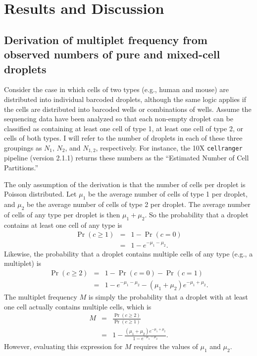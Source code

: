 \documentclass[fleqn,10pt]{wlpeerj} %
\begin{document}
\section*{Results and Discussion}
\label{sec:results}

\subsection*{Derivation of multiplet frequency from observed numbers of pure and mixed-cell droplets}
Consider the case in which cells of two types (e.g., human and mouse) are distributed into individual barcoded droplets, although the same logic applies if the cells are distributed into barcoded wells or combinations of wells.
Assume the sequencing data have been analyzed so that each non-empty droplet can be classified as containing at least one cell of type 1, at least one cell of type 2, or cells of both types.
I will refer to the number of droplets in each of these three groupings as $N_1$, $N_2$, and $N_{1,2}$, respectively.
For instance, the 10X \texttt{cellranger} pipeline (version 2.1.1) returns these numbers as the ``Estimated Number of Cell Partitions.''

The only assumption of the derivation is that the number of cells per droplet is Poisson distributed.
Let $\mu_1$ be the average number of cells of type 1 per droplet, and $\mu_2$ be the average number of cells of type 2 per droplet.
The average number of cells of any type per droplet is then $\mu_1 + \mu_2$.
So the probability that a droplet contains at least one cell of any type is
\begin{eqnarray}
\label{eq:Pr1}
\Pr\left(c \ge 1\right) &=& 1 - \Pr\left(c = 0 \right) \nonumber \\
&=& 1 - e^{-\mu_1 - \mu_2}.
\end{eqnarray}
Likewise, the probability that a droplet contains multiple cells of any type (e.g., a multiplet) is
\begin{eqnarray}
\label{eq:Pr2}
\Pr\left(c \ge 2\right) &=& 1 - \Pr\left(c = 0\right) - \Pr\left(c = 1\right) \nonumber \\
&=& 1 - e^{-\mu_1 - \mu_2} - \left(\mu_1 + \mu_2\right) e^{-\mu_1 + \mu_2}.
\end{eqnarray}
The multiplet frequency $M$ is simply the probability that a droplet with at least one cell actually contains multiple cells, which is
\begin{eqnarray}
\label{eq:M}
M &=& \frac{\Pr\left(c \ge 2\right)}{\Pr\left(c \ge 1\right)} \nonumber \\
&=& 1 - \frac{\left(\mu_1 + \mu_2\right) e^{-\mu_1 + \mu_2}}{1 - e^{-\mu_1 - \mu_2}}.
\end{eqnarray}
However, evaluating this expression for $M$ requires the values of $\mu_1$ and $\mu_2$.
\end{document}

